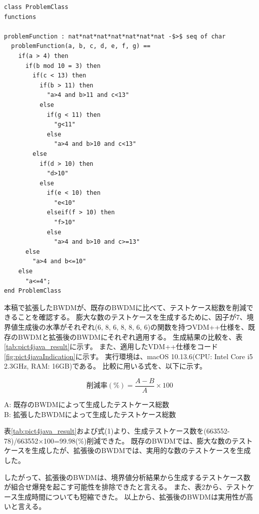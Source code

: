 \documentclass[uplatex, report, a4j, 10pt]{jsbook}
\begin{document}
\lstset{language=}
\noindent\begin{minipage}{\textwidth}
  \begin{lstlisting}[caption=因子が7、水準が(6 8 6 8 8 6 6)の関数を持つVDM++仕様,label=fig:pict4javaIndication]
class ProblemClass
functions

problemFunction : nat*nat*nat*nat*nat*nat*nat -$>$ seq of char
  problemFunction(a, b, c, d, e, f, g) ==
    if(a > 4) then
      if(b mod 10 = 3) then
        if(c < 13) then
          if(b > 11) then
            "a>4 and b>11 and c<13"
          else
            if(g < 11) then
              "g<11"
            else
              "a>4 and b>10 and c<13"
        else
          if(d > 10) then
            "d>10"
          else
            if(e < 10) then
              "e<10"
            elseif(f > 10) then
              "f>10"
            else
              "a>4 and b>10 and c>=13"
      else
        "a>4 and b<=10"
    else
      "a<=4";
end ProblemClass
\end{lstlisting}
\end{minipage}

本稿で拡張したBWDMが、既存のBWDMに比べて、テストケース総数を削減できることを確認する。
膨大な数のテストケースを生成するために、因子が7、境界値生成後の水準がそれぞれ(6, 8, 6, 8, 8, 6, 6)の関数を持つVDM++仕様を、既存のBWDMと拡張後のBWDMにそれぞれ適用する。
生成結果の比較を、表\ref{tab:pict4java_result}に示す。
また、適用したVDM++仕様をコード\ref{fig:pict4javaIndication}に示す。
実行環境は、macOS 10.13.6(CPU: Intel Core i5 2.3GHz, RAM: 16GB)である。
比較に用いる式を、以下に示す。

\begin{equation}
  削減率(\%) = \frac{A - B}{A} \times 100
\end{equation}

\begin{center}
  A: 既存のBWDMによって生成したテストケース総数\\
  B: 拡張したBWDMによって生成したテストケース総数\\
\end{center}

表\ref{tab:pict4java_result}および式(1)より、生成テストケース数を(663552-78)/663552×100=99.98(\%)削減できた。
既存のBWDMでは、膨大な数のテストケースを生成したが、拡張後のBWDMでは、実用的な数のテストケースを生成した。

したがって、拡張後のBWDMは、境界値分析結果から生成するテストケース数が組合せ爆発を起こす可能性を排除できたと言える。
また、表2から、テストケース生成時間についても短縮できた。
以上から、拡張後のBWDMは実用性が高いと言える。
\end{document}
